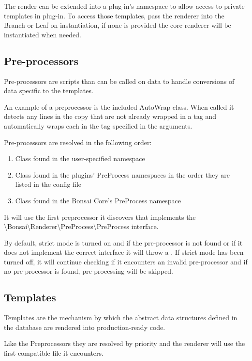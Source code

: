 \documentclass[]{book}
\begin{document}
The render can be extended into a plug-in's namespace to allow access to private templates in plug-in. To access those templates, pass the renderer into the Branch or Leaf on instantiation, if none is provided the core renderer will be instantiated when needed.

\subsection{Pre-processors}

Pre-processors are scripts than can be called on data to handle conversions of data specific to the templates.

An example of a preprocessor is the included AutoWrap class. When called it detects any lines in the copy that are not already wrapped in a tag and automatically wraps each in the tag specified in the arguments.

Pre-processors are resolved in the following order:

\begin{enumerate}
	\item Class found in the user-specified namespace
	\item Class found in the plugins' PreProcess namespaces in the order they are listed in the config file
	\item Class found in the Bonsai Core's PreProcess namespace
\end{enumerate}

It will use the first preprocessor it discovers that implements the \textbackslash Bonsai\textbackslash Renderer\textbackslash PreProcess\textbackslash PreProcess interface.

By default, strict mode is turned on and if the pre-processor is not found or if it does not implement the correct interface it will throw a . If strict mode has been turned off, it will continue checking if it encounters an invalid pre-processor and if no pre-processor is found, pre-processing will be skipped.

\subsection{Templates}

Templates are the mechanism by which the abstract data structures defined in the database are rendered into production-ready code.

Like the Preprocessors they are resolved by priority and the renderer will use the first compatible file it encounters.
\end{document}
